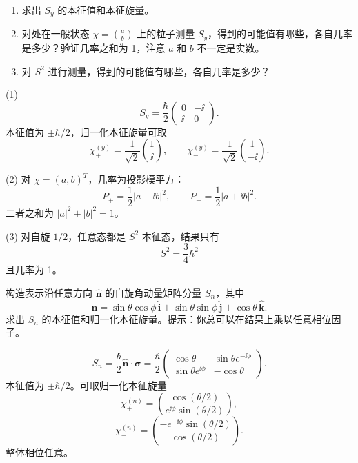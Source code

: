 \begin{question}
\begin{enumerate}
\item 求出 $S_y$ 的本征值和本征旋量。
\item 对处在一般状态 $\chi=\binom{a}{b}$ 上的粒子测量 $S_y$，得到的可能值有哪些，各自几率是多少？验证几率之和为 1，注意 $a$ 和 $b$ 不一定是实数。
\item 对 $S^2$ 进行测量，得到的可能值有哪些，各自几率是多少？
\end{enumerate}
\end{question}
\begin{solution}

(1) 
\[
S_y=\frac\hbar2\begin{pmatrix}0&-\ii\\ \ii&0\end{pmatrix}.
\]
本征值为 $\pm\hbar/2$，归一化本征旋量可取
\[
\chi_+^{(y)}=\frac1{\sqrt2}\binom{1}{\ii},
\qquad
\chi_-^{(y)}=\frac1{\sqrt2}\binom{1}{-\ii}.
\]

(2) 对 $\chi=(a,b)^T$，几率为投影模平方：
\[
P_+=\frac12|a-\ii b|^2,
\qquad
P_-=\frac12|a+\ii b|^2.
\]
二者之和为 $|a|^2+|b|^2=1$。

(3) 对自旋 $1/2$，任意态都是 $S^2$ 本征态，结果只有
\[
S^2=\frac34\hbar^2
\]
且几率为 1。

\end{solution}

\begin{question}
构造表示沿任意方向 $\hat{\mathbf n}$ 的自旋角动量矩阵分量 $S_n$，其中
\[
\hat{\mathbf n}=\sin\theta\cos\phi\,\hat{\mathbf i}+\sin\theta\sin\phi\,\hat{\mathbf j}+\cos\theta\,\hat{\mathbf k}.
\]
求出 $S_n$ 的本征值和归一化本征旋量。提示：你总可以在结果上乘以任意相位因子。
\end{question}
\begin{solution}

\[
S_n=\frac\hbar2\hat{\mathbf n}\cdot\boldsymbol\sigma
=\frac\hbar2\begin{pmatrix}
\cos\theta&\sin\theta e^{-\ii\phi}\\
\sin\theta e^{\ii\phi}&-\cos\theta
\end{pmatrix}.
\]
本征值为 $\pm\hbar/2$。可取归一化本征旋量
\[
\chi_+^{(n)}=\binom{\cos(\theta/2)}{e^{\ii\phi}\sin(\theta/2)},
\]
\[
\chi_-^{(n)}=\binom{-e^{-\ii\phi}\sin(\theta/2)}{\cos(\theta/2)}.
\]
整体相位任意。

\end{solution}

